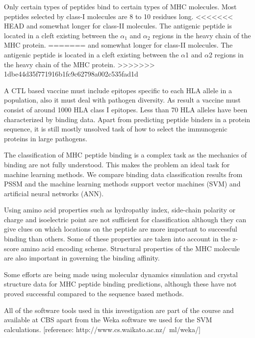 Only certain types of peptides bind to certain types of MHC molecules. Most peptides selected by class-I molecules are 8 to 10 residues long. 
<<<<<<< HEAD
and somewhat longer for class-II molecules. The antigenic peptide is located in a cleft existing between the $\alpha_1$ and $\alpha_2$ regions in the heavy chain of the MHC protein.
=======
and somewhat longer for class-II molecules. The antigenic peptide is located in a cleft existing between the $\alpha$1 and $\alpha$2 regions in the heavy chain of the MHC protein.
>>>>>>> 1dbe44d35f771916b1fc9c62798a002c535fad1d

A CTL based vaccine must include epitopes specific to each HLA allele in a population, also it must deal with pathogen diversity. As result a vaccine must consist of around 1000 HLA class I epitopes.
Less than 70 HLA alleles have been characterized by binding data. Apart from predicting peptide binders in a protein sequence, it is still  mostly unsolved task of how to select the immunogenic proteins in large pathogens.

The classification of MHC peptide binding is a complex task as the mechanics of binding are not fully understood. 
This makes the problem an ideal task for machine learning methods. We compare binding data classification results from PSSM and the machine learning methods support vector machines (SVM) and artificial neural networks (ANN).

Using amino acid properties such as hydropathy index, side-chain polarity or charge and isoelectric point are not sufficient for classification although they can give clues on which locations on the peptide are more important to successful binding than others. 
Some of these properties are taken into account in the z-score amino acid encoding scheme. Structural properties of the MHC molecule are also important in governing the binding affinity.

Some efforts are being made using molecular dynamics simulation and crystal structure data for MHC peptide binding predictions, although these have not proved successful compared to the sequence based methods.

All of the software tools used in this investigation are part of the course and available at CBS apart from the Weka software we used for the SVM calculations. [reference: http://www.cs.waikato.ac.nz/~ml/weka/]

